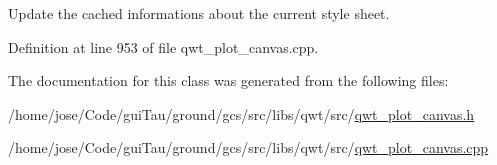 Update the cached informations about the current style sheet. 



Definition at line 953 of file qwt\-\_\-plot\-\_\-canvas.\-cpp.



The documentation for this class was generated from the following files\-:\begin{DoxyCompactItemize}
\item 
/home/jose/\-Code/gui\-Tau/ground/gcs/src/libs/qwt/src/\hyperlink{qwt__plot__canvas_8h}{qwt\-\_\-plot\-\_\-canvas.\-h}\item 
/home/jose/\-Code/gui\-Tau/ground/gcs/src/libs/qwt/src/\hyperlink{qwt__plot__canvas_8cpp}{qwt\-\_\-plot\-\_\-canvas.\-cpp}\end{DoxyCompactItemize}
